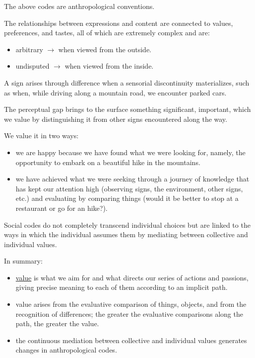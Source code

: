 The above codes are anthropological conventions.

The relationships between expressions and content are connected to values, preferences, and tastes, all of which are extremely complex and are:

\begin{itemize}
\tightlist
\item arbitrary \(\rightarrow\) when viewed from the outside.
\item undisputed \(\rightarrow\) when viewed from the inside.
\end{itemize}

A sign arises through difference when a sensorial discontinuity materializes, such as when, while driving along a mountain road, we encounter parked cars.

The perceptual gap brings to the surface something significant, important, which we value by distinguishing it from other signs encountered along the way.

We value it in two ways:

\begin{itemize}
\tightlist
\item we are happy because we have found what we were looking for, namely, the opportunity to embark on a beautiful hike in the mountains.
\item we have achieved what we were seeking through a journey of knowledge that has kept our attention high (observing signs, the environment, other signs, etc.) and evaluating by comparing things (would it be better to stop at a restaurant or go for an hike?).
\end{itemize}

Social codes do not completely transcend individual choices but are linked to the ways in which the individual assumes them by mediating between collective and individual values.

In summary:

\begin{itemize}
\tightlist
\item \href{sordi1.mp4}{value} is what we aim for and what directs our series of actions and passions, giving precise meaning to each of them according to an implicit path.
\item value arises from the evaluative comparison of things, objects, and from the recognition of differences; the greater the evaluative comparisons along the path, the greater the value.
\item the continuous mediation between collective and individual values \hspace{0pt}\hspace{0pt}generates changes in anthropological codes.
\end{itemize}

